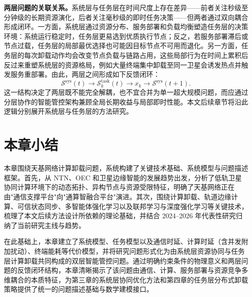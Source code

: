 \textbf{两层问题的关联关系。}系统层与任务层在时间尺度上存在差异——前者关注秒级至分钟级的长期资源演化，后者关注毫秒级的即时任务决策——但两者通过双向耦合形成闭环。一方面，系统层通过资源分布、服务部署和负载均衡塑造任务层的决策环境：系统运行稳定时，任务层更易选到优质执行节点；反之，若服务部署滞后或节点过载，任务层的局部最优选择也可能因目标节点不可用而退化。另一方面，任务层的每次卸载动作均会改变节点负载与链路占用，这些局部行为在时间上累积后反过来重塑系统层的资源格局，例如大量终端集中卸载至同一卫星会诱发热点并触发服务重部署\cite{Tang2024TwoTimescaleJSAC,Feng2026LatencyAware}。由此，两层之间形成如下反馈闭环：
\begin{equation}
  \mathcal{S}^{\mathrm{sys}}(t)\rightarrow \mathcal{S}^{\mathrm{task}}_k(t)\rightarrow x_k \rightarrow \mathcal{S}^{\mathrm{sys}}(t+1).
\end{equation}
这一结构决定了两层既不能完全解耦，也不宜合并为单一超大规模问题，而应通过分层协作的智能管控架构兼顾全局长期收益与局部即时性能。本文后续章节将沿此逻辑分别展开系统层与任务层的方法研究。

\section{本章小结}

本章围绕天基网络计算卸载问题，系统构建了关键技术基础、系统模型与问题描述框架。首先，从 NTN、OEC 和卫星边缘智能的发展趋势出发，分析了低轨卫星协同计算环境下的动态拓扑、异构节点与资源受限特征，明确了天基网络正在由"通信支撑平台"向"通算智融合平台"演进\cite{Saad2024NTNRel1718,Yin2025OECSurvey,Wang2025NTN6G}。其次，围绕计算卸载、轨道边缘计算、可信状态同步、多智能体强化学习以及联邦学习与深度强化学习等关键技术，梳理了本文后续方法设计所依赖的理论基础，并结合 2024--2026 年代表性研究归纳了当前研究主线与趋势\cite{Tang2024TwoTimescaleJSAC,Li2024MARLComCom,Matthiesen2024FLSatellites,Fan2025SEI,Feng2026LatencyAware}。

在此基础上，本章建立了系统模型、任务模型以及通信时延、计算时延（含并发附加扰动）、终端能耗等代价模型，并将研究问题形式化为由系统层资源协同与任务层计算卸载共同构成的双层智能管控问题。通过明确约束条件的物理意义和两层问题的反馈闭环结构，本章清晰揭示了该问题由通信、计算、服务部署与资源竞争多维耦合的本质特征，为第三章的系统层协同优化方法和第四章的任务层分布式卸载策略提供了统一的问题描述基础与数学建模接口。
